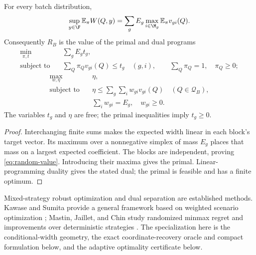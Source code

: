 \begin{proposition}
\label{prop:random-finite}
For every batch distribution,
\begin{equation}
 \sup_{y\in\F}\mathbb E_\pi W(Q,y)
 =\sum_g E_g\max_{i\in\M_g}\mathbb E_\pi v_{gi}(Q).
 \label{eq:random-value}
\end{equation}
Consequently $R_B$ is the value of the primal and dual programs
\begin{equation}
 \begin{aligned}
 \min_{\pi,t}\quad &\sum_g E_g t_g,\\
 \text{subject to}\quad
 &\sum_Q\pi_Qv_{gi}(Q)\leq t_g\quad(g,i),\qquad
   \sum_Q\pi_Q=1,\quad\pi_Q\geq0;
 \end{aligned}
 \label{eq:random-primal}
\end{equation}
\begin{equation}
 \begin{aligned}
 \max_{w,\eta}\quad &\eta,\\
 \text{subject to}\quad
 &\eta\leq\sum_g\sum_i w_{gi}v_{gi}(Q)\quad(Q\in\mathcal Q_B),\\
 &\sum_i w_{gi}=E_g,\quad w_{gi}\geq0.
 \end{aligned}
 \label{eq:random-dual}
\end{equation}
The variables $t_g$ and $\eta$ are free; the primal inequalities imply
$t_g\geq0$.
\end{proposition}
\begin{proof}
Interchanging finite sums makes the expected width linear in each
block's target vector. Its maximum over a nonnegative simplex of mass
$E_g$ places that mass on a largest expected coefficient. The blocks are
independent, proving \eqref{eq:random-value}. Introducing their maxima
gives the primal. Linear-programming duality gives the stated dual;
the primal is feasible and has a finite optimum.
\end{proof}

Mixed-strategy robust optimization and dual separation are established
methods. Kawase and Sumita provide a general framework based on weighted
scenario optimization \citep{kawase2024}; Mastin, Jaillet, and Chin study
randomized minmax regret and improvements over deterministic strategies
\citep{mastin2015}. The specialization here is the conditional-width
geometry, the exact coordinate-recovery oracle and compact formulation
below, and the adaptive optimality certificate below.

